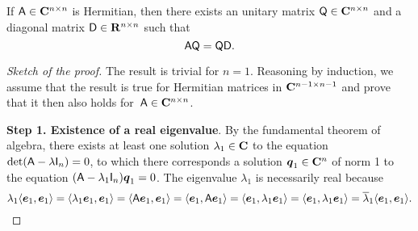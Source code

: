 \begin{theorem}
    \label{theorem:spectral_theorem}
    If $\mathsf A \in \mathbf C^{n \times n}$ is Hermitian,
    then there exists an unitary matrix $\mathsf Q \in \mathbf C^{n \times n}$ and a diagonal matrix $\mathsf D \in \mathbf R^{n \times n}$ such that
    \[
        \mathsf A \mathsf Q = \mathsf Q \mathsf D.
    \]
\end{theorem}
\begin{proof}
    [Sketch of the proof]
    The result is trivial for $n = 1$.
    Reasoning by induction,
    we assume that the result is true for Hermitian matrices in $\mathbf C^{n-1 \times n-1}$
    and prove that it then also holds for~$\mathsf A \in \mathbf C^{n \times n}$.

            \vspace{.3cm}
            \textbf{Step 1. Existence of a real eigenvalue}.
            By the fundamental theorem of algebra,
            there exists at least one solution $\lambda_1 \in \mathbf C$ to the equation $\det(\mathsf A - \lambda \mathsf I_n) = 0$,
            to which there corresponds a solution $\mathbf{\boldsymbol{q}}_1 \in \mathbf C^n$ of norm 1 to the equation $(\mathsf A - \lambda_1 \mathsf I_n) \mathbf{\boldsymbol{q}}_{1} = 0$.
            The eigenvalue $\lambda_1$ is necessarily real because
            \[
                \lambda_1 \langle\mathbf{\boldsymbol{e}}_1, \mathbf{\boldsymbol{e}}_1\rangle
                = \langle\lambda_1 \mathbf{\boldsymbol{e}}_1, \mathbf{\boldsymbol{e}}_1\rangle
                = \langle\mathsf A \mathbf{\boldsymbol{e}}_1, \mathbf{\boldsymbol{e}}_1\rangle
                = \langle\mathbf{\boldsymbol{e}}_1, \mathsf A\mathbf{\boldsymbol{e}}_1\rangle
                = \langle\mathbf{\boldsymbol{e}}_1, \lambda_1 \mathbf{\boldsymbol{e}}_1\rangle
                = \langle\mathbf{\boldsymbol{e}}_1, \lambda_1 \mathbf{\boldsymbol{e}}_1\rangle
                = \overline \lambda_1 \langle\mathbf{\boldsymbol{e}}_1, \mathbf{\boldsymbol{e}}_1\rangle.
            \]


\end{proof}
